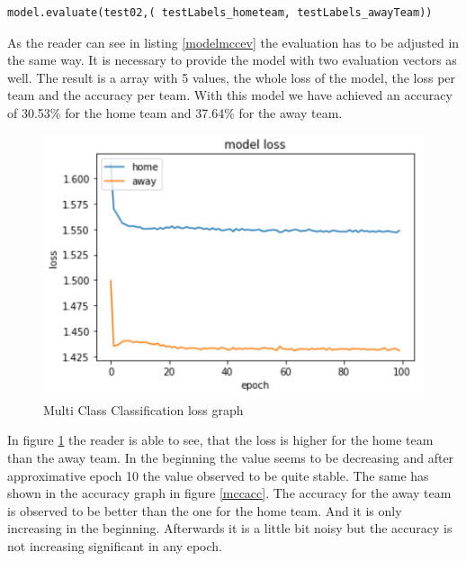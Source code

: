 \begin{lstlisting}[language=Python, caption=Python code for multi class classification model evaluation, label=modelmccev]
model.evaluate(test02,( testLabels_hometeam, testLabels_awayTeam))
\end{lstlisting}

As the reader can see in listing \ref{modelmccev} the evaluation has to be adjusted in the same way. It is necessary to provide the model with two evaluation vectors as well. The result is a array with 5 values, the whole loss of the model, the loss per team and the accuracy per team. With this model we have achieved an accuracy of 30.53\% for the home team and 37.64\% for the away team. 

\begin{figure}[H]
\begin{center}
\includegraphics[scale=1.5]{images/mccloss.PNG}
\end{center}
\caption{Multi Class Classification loss graph}
\label{mccloss}
\end{figure}

In figure \ref{mccloss} the reader is able to see, that the loss is higher for the home team than the away team. In the beginning the value seems to be decreasing and after approximative epoch 10 the value observed to be quite stable. The same has shown in the accuracy graph in figure \ref{mccacc}. The accuracy for the away team is observed to be better than the one for the home team. And it is only increasing in the beginning. Afterwards it is a little bit noisy but the accuracy is not increasing significant in any epoch. 

